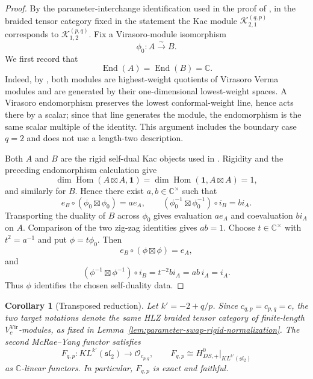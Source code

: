 \documentclass[12pt,leqno]{amsart}
\numberwithin{equation}{section}
\newtheorem{cor}[thm]{Corollary}
\newcommand{\End}{\operatorname{End}}
\newcommand{\Hom}{\operatorname{Hom}}
\newcommand{\KL}{KL}
\newcommand{\Oc}{\mathcal O}
\def\C{\mathbb{C}}
\begin{document}
\begin{proof}
By the parameter-interchange identification used in the proof of
\cite[Theorem~7.15]{McRaeYang}, in the braided tensor category fixed in
the statement the Kac module $\mathcal K^{(q,p)}_{2,1}$ corresponds to
$\mathcal K^{(p,q)}_{1,2}$.  Fix a Virasoro-module isomorphism
\[
 \phi_0:A\xrightarrow{\sim}B.
\]
We first record that
\[
 \End(A)=\End(B)=\C.
\]
Indeed, by \cite[Remark~2.2]{McRaeSopin}, both modules are
highest-weight quotients of Virasoro Verma modules and are generated by
their one-dimensional lowest-weight spaces.  A Virasoro endomorphism
preserves the lowest conformal-weight line, hence acts there by a scalar;
since that line generates the module, the endomorphism is the same scalar
multiple of the identity.  This argument includes the boundary case
$q=2$ and does not use a length-two description.

Both $A$ and $B$ are the rigid self-dual Kac objects used in
\cite[Theorem~7.15]{McRaeYang}.  Rigidity and the preceding endomorphism
calculation give
\[
 \dim\Hom(A\boxtimes A,\mathbf1)
 =\dim\Hom(\mathbf1,A\boxtimes A)=1,
\]
and similarly for $B$.  Hence there exist $a,b\in\C^\times$ such that
\[
 e_B\circ(\phi_0\boxtimes\phi_0)=a e_A,
 \qquad
 (\phi_0^{-1}\boxtimes\phi_0^{-1})\circ i_B=b i_A.
\]
Transporting the duality of $B$ across $\phi_0$ gives evaluation
$a e_A$ and coevaluation $b i_A$ on $A$.  Comparison of the two
zig-zag identities gives $ab=1$.  Choose $t\in\C^\times$ with
$t^2=a^{-1}$ and put $\phi=t\phi_0$.  Then
\[
 e_B\circ(\phi\boxtimes\phi)=e_A,
\]
and
\[
 (\phi^{-1}\boxtimes\phi^{-1})\circ i_B
 =t^{-2}b i_A=ab\,i_A=i_A.
\]
Thus $\phi$ identifies the chosen self-duality data.
\end{proof}

\begin{cor}[Transposed reduction]\label{cor:transposed-reduction}
Let $k'=-2+q/p$.  Since $c_{q,p}=c_{p,q}=c$, the two target
notations denote the same HLZ braided tensor category of finite-length
$V_c^{\mathrm{Vir}}$-modules, as fixed in
Lemma~\ref{lem:parameter-swap-rigid-normalization}.  The second
McRae--Yang functor satisfies
\[
 F_{q,p}:\KL^{k'}(\mathfrak{sl}_2)\longrightarrow\Oc_{c_{p,q}},
 \qquad
 F_{q,p}\cong H^0_{DS,+}\big|_{\KL^{k'}(\mathfrak{sl}_2)}
\]
as $\C$-linear functors.  In particular, $F_{q,p}$ is exact and faithful.
\end{cor}
\end{document}
